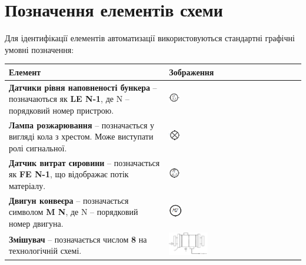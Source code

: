 \documentclass[a4paper]{article}
\begin{document}
\newpage

\section*{Позначення елементів схеми}
Для ідентифікації елементів автоматизації використовуються стандартні графічні умовні позначення:
\begin{table}[h!]
\centering
\begin{tabular}{|p{}|p{}|}
\hline
\textbf{Елемент} & \textbf{Зображення} \\ \hline
\textbf{Датчики рівня наповненості бункера} – позначаються як \textbf{LE N-1}, де N – порядковий номер пристрою. & 
\includegraphics[width=0.08\textwidth]{imgs/PW2.1.png} \\ \hline

\textbf{Лампа розжарювання} – позначається у вигляді кола з хрестом. Може виступати ролі сигнальної. & 
\includegraphics[width=0.08\textwidth]{imgs/PW2.2.png} \\ \hline

\textbf{Датчик витрат сировини} – позначається як \textbf{FE N-1}, що відображає потік матеріалу. & 
\includegraphics[width=0.08\textwidth]{imgs/PW2.3.png} \\ \hline

\textbf{Двигун конвеєра} – позначається символом \textbf{M N}, де N – порядковий номер двигуна. & 
\includegraphics[width=0.1\textwidth]{imgs/PW2.4.png} \\ \hline

\textbf{Змішувач} – позначається числом \textbf{8} на технологічній схемі. & 
\includegraphics[width=0.3\textwidth]{imgs/PW2.5.png} \\ \hline


\end{tabular}
\end{table}
\end{document}
